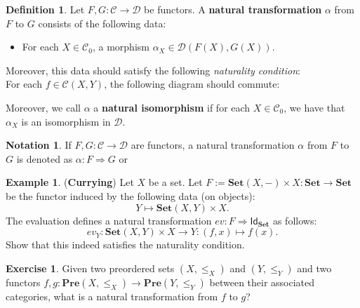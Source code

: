\documentclass[a4paper,10pt]{scrartcl}
\theoremstyle{plain}
\theoremstyle{definition}
\newtheorem{dfn}[thm]{Definition}
\newtheorem{exa}[thm]{Example}
\newtheorem{exer}[thm]{Exercise}
\newtheorem{nota}[thm]{Notation}
\newcommand{\cfont}[1]{\ensuremath{\mathsf{#1}}}
\newcommand{\Cat}[1]{\mathcal{#1}}
\newcommand{\CC}{\Cat{C}}
\newcommand{\DD}{\Cat{D}}
\newcommand{\Catb}[1]{\mathbf{#1}}
\newcommand{\SET}{\Catb{Set}}
\newcommand{\PRE}{\Catb{Pre}}
\newcommand{\Ob}[1]{{#1}_0}
\newcommand{\CHom}[3]{{#1}(#2,#3)}
\newcommand{\Id}[1][]{\cfont{Id}_{#1}}
\newcommand{\NatTrans}[3]{#1 : #2 \Rightarrow #3}
\begin{document}
\begin{dfn} Let $F,G: \CC\to\DD$ be functors. A \textbf{natural transformation} $\alpha$ from $F$ to $G$ consists of the following data:
\begin{itemize}
\item For each $X\in \Ob{\CC}$, a morphism $\alpha_X \in \CHom{\DD}{F(X)}{G(X)}$.
\end{itemize}
Moreover, this data should satisfy the following \textit{naturality condition}:\\
For each $f\in \CHom{\CC}{X}{Y}$, the following diagram should commute:
\begin{center}
\end{center}
Moreover, we call $\alpha$ a \textbf{natural isomorphism} if for each $X\in\Ob{\CC}$, we have that $\alpha_X$ is an isomorphism in $\DD$.
\end{dfn}

\begin{nota} If $F,G:\CC\to\DD$ are functors, a natural transformation $\alpha$ from $F$ to $G$ is denoted as $\NatTrans{\alpha}{F}{G}$ or 
\begin{center}
\end{center}
\end{nota}

\begin{exa} (\textbf{Currying}) Let $X$ be a set. Let $F := \SET(X, -)\times X : \SET\to\SET$ be the functor induced by the following data (on objects):
\[
Y\mapsto \SET(X,Y)\times X.
\]
The evaluation defines a natural transformation $\NatTrans{ev}{F}{\Id[\SET]}$ as follows:
\[
ev_Y : \SET(X,Y) \times X \to Y : (f,x) \mapsto f(x).
\]
Show that this indeed satisfies the naturality condition.
\end{exa}

\begin{exer}
  Given two preordered sets $(X,\leq_X)$ and $(Y, \leq_Y)$ and two functors $f, g : \PRE(X,\leq_X) \to \PRE(Y,\leq_Y)$ between their associated categories, what is a natural transformation from $f$ to $g$?
\end{exer}
\end{document}
